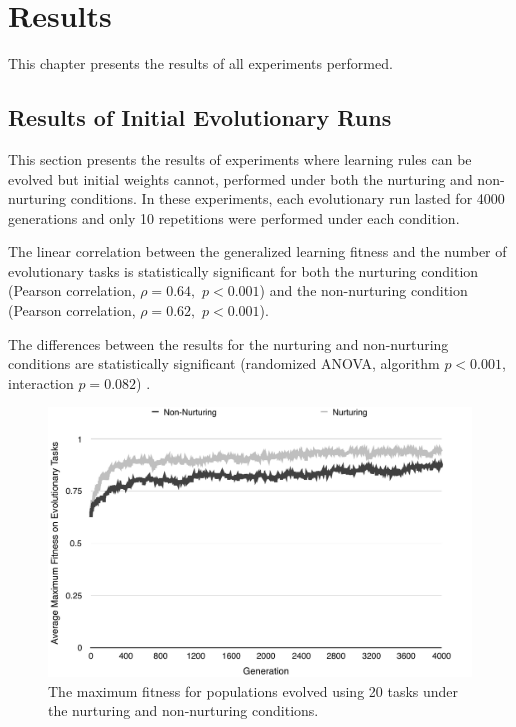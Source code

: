 \documentclass[master]{outhesis}
\begin{document}
\chapter{Results}

This chapter presents the results of all experiments performed.

\section{Results of Initial Evolutionary Runs}

This section presents the results of experiments where learning rules can be evolved but initial weights cannot, performed under both the nurturing and non-nurturing conditions.
In these experiments, each evolutionary run lasted for 4000 generations and only 10 repetitions were performed under each condition.

The linear correlation between the generalized learning fitness and the number of evolutionary tasks is statistically significant for both
the nurturing condition (Pearson correlation, $\rho=0.64,$ $p < 0.001$)
and the non-nurturing condition (Pearson correlation, $\rho=0.62,$ $p < 0.001$).

The differences between the results for the nurturing and non-nurturing conditions are statistically significant (randomized ANOVA, algorithm $p < 0.001$, interaction $p = 0.082$) \citet{Piater:1998aa}.

\begin{figure}[H]
	\centering
	\includegraphics{ChalmersEvolution.pdf}
	\caption{The maximum fitness for populations evolved using 20 tasks under the nurturing and non-nurturing conditions.}
	\label{fig:ChalmersEvolution}
\end{figure}
\end{document}
